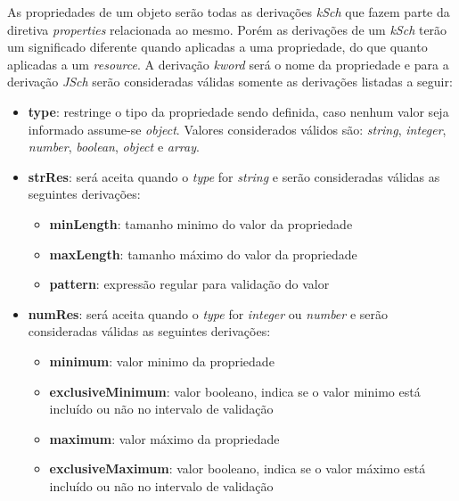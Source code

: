 \label{sec:bnf:props}
As propriedades de um objeto serão todas as derivações \textit{kSch} que fazem parte da diretiva \textit{properties} relacionada ao mesmo. Porém as derivações de um \textit{kSch} terão um significado diferente quando aplicadas a uma propriedade, do que quanto aplicadas a um \textit{resource}. A derivação \textit{kword} será o nome da propriedade e para a derivação \textit{JSch} serão consideradas válidas somente as derivações listadas a seguir:
\begin{itemize}


    \item \textbf{type}: restringe o tipo da propriedade sendo definida, caso nenhum valor seja informado assume-se \textit{object}. Valores considerados válidos são: \textit{string}, \textit{integer}, \textit{number}, \textit{boolean}, \textit{object} e \textit{array}.

    \item \textbf{strRes}: será aceita quando o \textit{type} for \textit{string} e serão consideradas válidas as seguintes derivações:
    \begin{itemize}
        \item \textbf{minLength}: tamanho minimo do valor da propriedade
        \item \textbf{maxLength}: tamanho máximo do valor da propriedade
        \item \textbf{pattern}: expressão regular para validação do valor
    \end{itemize}

    \item \textbf{numRes}: será aceita quando o \textit{type} for \textit{integer} ou \textit{number} e serão consideradas válidas as seguintes derivações:
    \begin{itemize}
        \item \textbf{minimum}: valor minimo da propriedade
        \item \textbf{exclusiveMinimum}: valor booleano, indica se o valor minimo está incluído ou não no intervalo de validação
        \item \textbf{maximum}: valor máximo da propriedade
        \item \textbf{exclusiveMaximum}: valor booleano, indica se o valor máximo está incluído ou não no intervalo de validação
    \end{itemize}


\end{itemize}
